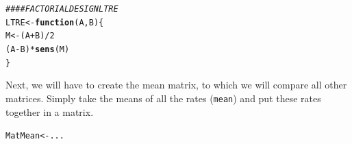 \documentclass{article}\usepackage[]{graphicx}\usepackage[]{color}
\makeatletter
\newcommand{\hlnum}[1]{\textcolor[rgb]{0.686,0.059,0.569}{#1}}%
\newcommand{\hlcom}[1]{\textcolor[rgb]{0.678,0.584,0.686}{\textit{#1}}}%
\newcommand{\hlopt}[1]{\textcolor[rgb]{0,0,0}{#1}}%
\newcommand{\hlstd}[1]{\textcolor[rgb]{0.345,0.345,0.345}{#1}}%
\newcommand{\hlkwa}[1]{\textcolor[rgb]{0.161,0.373,0.58}{\textbf{#1}}}%
\newcommand{\hlkwb}[1]{\textcolor[rgb]{0.69,0.353,0.396}{#1}}%
\newcommand{\hlkwc}[1]{\textcolor[rgb]{0.333,0.667,0.333}{#1}}%
\newcommand{\hlkwd}[1]{\textcolor[rgb]{0.737,0.353,0.396}{\textbf{#1}}}%
\newenvironment{kframe}{%
 \def\at@end@of@kframe{}%
 \ifinner\ifhmode%
  \def\at@end@of@kframe{\end{minipage}}%
  \begin{minipage}{\columnwidth}%
 \fi\fi%
 \def\FrameCommand##1{\hskip\@totalleftmargin \hskip-\fboxsep
 \colorbox{shadecolor}{##1}\hskip-\fboxsep
     \hskip-\linewidth \hskip-\@totalleftmargin \hskip\columnwidth}%
 \MakeFramed {\advance\hsize-\width
   \@totalleftmargin\z@ \linewidth\hsize
   \@setminipage}}%
 {\par\unskip\endMakeFramed%
 \at@end@of@kframe}
\newenvironment{knitrout}{}{} %
\makeatother
\begin{document}
\begin{knitrout}
\color{fgcolor}\begin{kframe}
\begin{alltt}
\hlcom{#### FACTORIAL DESIGN LTRE}
\hlstd{LTRE} \hlkwb{<-} \hlkwa{function}\hlstd{(}\hlkwc{A}\hlstd{,}\hlkwc{B}\hlstd{)\{}
  \hlstd{M} \hlkwb{<-} \hlstd{(A}\hlopt{+}\hlstd{B)}\hlopt{/}\hlnum{2}
  \hlstd{(A}\hlopt{-}\hlstd{B)} \hlopt{*} \hlkwd{sens}\hlstd{(M)}
\hlstd{\}}
\end{alltt}
\end{kframe}
\end{knitrout}
Next, we will have to create the mean matrix, to which we will compare all other matrices. Simply take the means of all the rates (\texttt{mean}) and put these rates together in a matrix.
\begin{knitrout}
\color{fgcolor}\begin{kframe}
\begin{alltt}
\hlstd{MatMean} \hlkwb{<-} \hlstd{...}
\end{alltt}
\end{kframe}
\end{knitrout}
\end{document}
